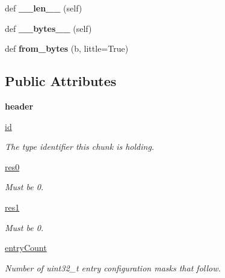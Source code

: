 \begin{DoxyCompactItemize}
\item 
\mbox{\label{classarsc_1_1tabletype_1_1ResTable__typeSpec__header_aa23463eacdcb61cbb0158a03346ca58f}} 
def {\bfseries \+\_\+\+\_\+len\+\_\+\+\_\+} (self)
\item 
\mbox{\label{classarsc_1_1tabletype_1_1ResTable__typeSpec__header_a6fb1673161b95bd040111b620769c507}} 
def {\bfseries \+\_\+\+\_\+bytes\+\_\+\+\_\+} (self)
\item 
\mbox{\label{classarsc_1_1tabletype_1_1ResTable__typeSpec__header_a62a7d0fab7e6f83941eef13140cb1fc4}} 
def {\bfseries from\+\_\+bytes} (b, little=True)
\end{DoxyCompactItemize}
\subsection*{Public Attributes}
\begin{DoxyCompactItemize}
\item 
\mbox{\label{classarsc_1_1tabletype_1_1ResTable__typeSpec__header_ace926b246b275e57a6ee7398a5fa457e}} 
{\bfseries header}
\item 
\mbox{\hyperlink{classarsc_1_1tabletype_1_1ResTable__typeSpec__header_a55532e4c76555a07dde16b0c1a6270ab}{id}}
\begin{DoxyCompactList}\small\item\em The type identifier this chunk is holding. \end{DoxyCompactList}\item 
\mbox{\hyperlink{classarsc_1_1tabletype_1_1ResTable__typeSpec__header_af16c543f562a5cc087c8b9e964767580}{res0}}
\begin{DoxyCompactList}\small\item\em Must be 0. \end{DoxyCompactList}\item 
\mbox{\hyperlink{classarsc_1_1tabletype_1_1ResTable__typeSpec__header_a750db941c46e694f53b17c66e3e884b9}{res1}}
\begin{DoxyCompactList}\small\item\em Must be 0. \end{DoxyCompactList}\item 
\mbox{\hyperlink{classarsc_1_1tabletype_1_1ResTable__typeSpec__header_a6747faeedd7cb05811bf2202c27e3152}{entry\+Count}}
\begin{DoxyCompactList}\small\item\em Number of uint32\+\_\+t entry configuration masks that follow. \end{DoxyCompactList}\end{DoxyCompactItemize}
